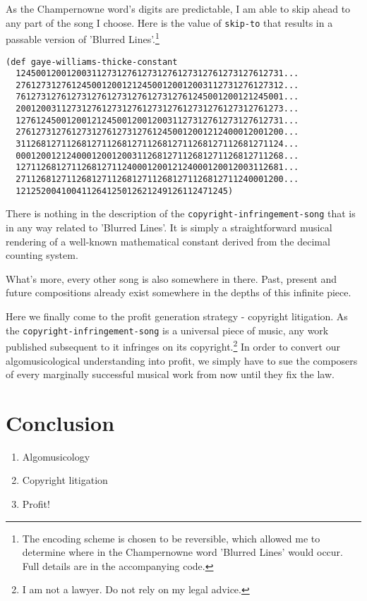 \documentclass[numbers]{sigplanconf}
\begin{document}
As the Champernowne word's digits are predictable, I am able to skip ahead to any part of the song I choose. Here
is the value of \verb|skip-to| that results in a passable version of 'Blurred Lines'.\footnote{The encoding scheme is chosen
to be reversible, which allowed me to determine where in the Champernowne word 'Blurred Lines' would occur. Full details are in the accompanying code.}

\begin{verbatim}
(def gaye-williams-thicke-constant
  12450012001200311273127612731276127312761273127612731...
  27612731276124500120012124500120012003112731276127312...
  76127312761273127612731276127312761245001200121245001...
  20012003112731276127312761273127612731276127312761273...
  12761245001200121245001200120031127312761273127612731...
  27612731276127312761273127612450012001212400012001200...
  31126812711268127112681271126812711268127112681271124...
  00012001212400012001200311268127112681271126812711268...
  12711268127112681271124000120012124000120012003112681...
  27112681271126812711268127112681271126812711240001200...
  121252004100411264125012621249126112471245)
\end{verbatim}

There is nothing in the description of the \verb|copyright-infringement-song| that is in any way related to 'Blurred Lines'.
It is simply a straightforward musical rendering of a well-known mathematical constant derived from the decimal counting
system.

What's more, every other song is also somewhere in there. Past, present and future compositions already exist somewhere in
the depths of this infinite piece.

Here we finally come to the profit generation strategy - copyright litigation. As the \verb|copyright-infringement-song| is
a universal piece of music, any work published subsequent to it infringes on its copyright.\footnote{I am not a lawyer. Do not rely on my legal advice.} In order to convert our algomusicological understanding into profit, we simply have to sue the composers
of every marginally successful musical work from now until they fix the law.

\section{Conclusion}

\begin{enumerate}
    \item Algomusicology
    \item Copyright litigation
    \item Profit!
\end{enumerate}
\end{document}
